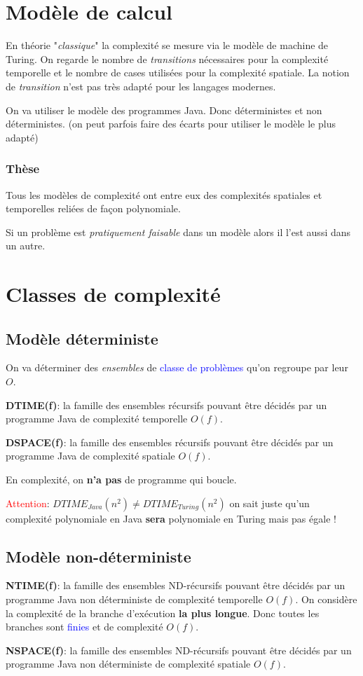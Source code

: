 \documentclass{report}
\begin{document}
\section{Modèle de calcul}
En théorie "\textit{classique}" la complexité se mesure via le modèle de machine de Turing. On regarde le nombre de \textit{transitions} nécessaires pour la complexité temporelle et le nombre de cases utilisées pour la complexité spatiale. La notion de \textit{transition} n'est pas très adapté pour les langages modernes.\par
On va utiliser le modèle des programmes Java. Donc déterministes et non déterministes. (on peut parfois faire des écarts pour utiliser le modèle le plus adapté)
\subsubsection{Thèse}
Tous les modèles de complexité ont entre eux des complexités spatiales et temporelles reliées de façon polynomiale.\par
Si un problème est \textit{pratiquement faisable} dans un modèle alors il l'est aussi dans un autre.

\section{Classes de complexité}
\subsection{Modèle déterministe}
On va déterminer des \textit{ensembles} de \textcolor{blue}{classe de problèmes} qu'on regroupe par leur $O$.\par
\textbf{DTIME(f)}: la famille des ensembles récursifs pouvant être décidés par un programme Java de complexité temporelle $O(f)$.\par 
\textbf{DSPACE(f)}: la famille des ensembles récursifs pouvant être décidés par un programme Java de complexité spatiale $O(f)$.\par
En complexité, on \textbf{n'a pas} de programme qui boucle.\par
\textcolor{red}{Attention}: $DTIME_{Java}(n^2) \neq DTIME_{Turing}(n^2)$ on sait juste qu'un complexité polynomiale en Java \textbf{sera} polynomiale en Turing mais pas égale !

\subsection{Modèle non-déterministe}
\textbf{NTIME(f)}: la famille des ensembles ND-récursifs pouvant être décidés par un programme Java non déterministe de complexité temporelle $O(f)$. On considère la complexité de la branche d'exécution \textbf{la plus longue}. Donc toutes les branches sont \textcolor{blue}{finies} et de complexité $O(f)$.\par
\textbf{NSPACE(f)}: la famille des ensembles ND-récursifs pouvant être décidés par un programme Java non déterministe de complexité spatiale $O(f)$.
\end{document}

